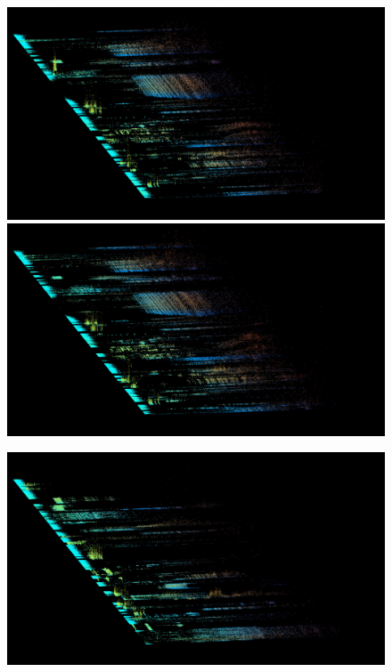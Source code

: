 \documentclass{article}
\begin{document}
\begin{figure}

\begin{multicols}{2}
    \includegraphics[width=\linewidth]{preset-50-15.jpg}%
    \includegraphics[width=\linewidth]{preset-50-16.jpg}%
\end{multicols}
\begin{multicols}{2}
    \includegraphics[width=\linewidth]{preset-50-7.jpg}%

\end{multicols}
\end{figure}
\end{document}
